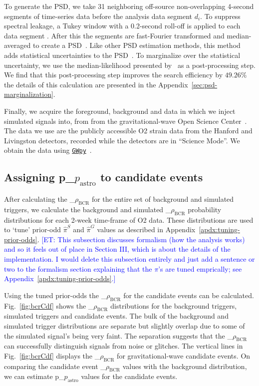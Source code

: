 \documentclass[%
 nofootinbib,
 amsmath,amssymb,
 aps,
 twocolumn,
 superscriptaddress
]{revtex4-2}
\newcommand{\gwpy}{{\sc \href{https://gwpy.github.io/}{\texttt{GWpy}}}\xspace}
\newcommand{\fancytext}[1]{{\relax\ifmmode#1\else $#1$\fi}\xspace}
\newcommand{\mathcmd}[1]{{\sc \relax\ifmmode#1\else $#1$\fi}\xspace}
\newcommand{\bcr}{\mathcmd{\rho_\text{BCR}}}
\newcommand{\pastro}{\fancytext{p_\text{astro}}}
\newcommand{\et}[1]{\textcolor{blue}{[ET: #1]}}
\begin{document}
To generate the PSD, we take 31 neighboring off-source non-overlapping  4-second  segments of time-series data before the analysis data segment $d_i$. To suppress spectral leakage, a Tukey window with a 0.2-second roll-off is applied to each data segment . After this the segments are fast-Fourier transformed and median-averaged to create a PSD~\cite{ligo_psd}. Like other PSD estimation methods, this method adds statistical uncertainties to the PSD~\cite{psd_student_t, chatziioannou2019noise, Biscoveanu:2020:PhRvD}. To marginalize over the statistical uncertainty, we use the median-likelihood presented by~\citet{psd_student_t} as a post-processing step. We find that this post-processing step improves the search efficiency by $49.26\%$ the details of this calculation are presented in the Appendix~\ref{sec:psd-marginalization}.

Finally, we acquire the foreground, background and data in which we inject simulated signals into, from from the gravitational-wave Open Science Center~\cite{GWOSC}. The data we use are the publicly accessible O2 strain data from the Hanford and Livingston detectors, recorded while the detectors are in ``Science Mode''. We obtain the data using \gwpy~\cite{gwpy}. 

\subsection{Assigning \pastro to candidate events}
After calculating the \bcr for the entire set of background and simulated triggers, we calculate the background and simulated \bcr probability distributions for each 2-week time-frame of O2 data. These distributions are used to `tune' prior-odd $\hat{\pi}^S$ and $\hat{\pi}^G$ values as described in Appendix~\ref{apdx:tuning-prior-odds}.
\et{This subsection discusses formalism (how the analysis works) and so it feels out of place in Section III, which is about the details of the implementation. I would delete this subsection entirely and just add a sentence or two to the formalism section explaining that the $\pi$'s are tuned emprically; see Appendix~\ref{apdx:tuning-prior-odds}.}

Using the tuned prior-odds the \bcr for the candidate events can be calculated. Fig.~\ref{fig:bcrCdf} shows the \bcr distributions for the background triggers, simulated triggers and candidate events. The bulk of the background and simulated trigger distributions are separate but slightly overlap due to some of the simulated signal's being very faint. The separation suggests that the \bcr can successfully distinguish signals from noise or glitches. The vertical lines in Fig.~\ref{fig:bcrCdf} displays the \bcr for gravitational-wave candidate events. On comparing the candidate event \bcr values with the background distribution, we can estimate \pastro values for the candidate events. 
\end{document}
